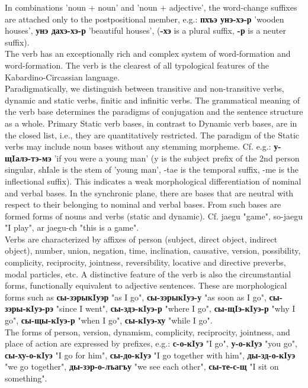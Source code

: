 \documentclass[a4paper,12pt]{book}
\newcommand{\1}[1]{\textbf{\emph{#1}}} %
\newcommand{\2}[1]{\textbf{[#1]}} %
\newcommand{\3}[1]{\fontsize{11pt}{0cm}\textbf{\emph{#1}}} %
\newcommand{\4}[1]{\fontsize{10pt}{0cm}\emph{#1}}	%
\newcommand{\5}[1]{\textbf{/#1/}} %
\newcommand{\6}[1]{\textbf{[#1]}} %
\newcommand{\7}[1]{\fontsize{12pt}{0cm}\emph{#1}} %
\newcommand{\8}[1]{\fontsize{12pt}{0cm}`#1'} %
\newcommand{\9}[1]{\fontsize{12pt}{0cm}(lit. `#1')} %
\begin{document}
In combinations 'noun + noun' and 'noun + adjective', the word-change suffixes are attached only to the postpositional member, e.g.: \textbf{пхъэ унэ-хэ-р} 'wooden houses', \textbf{унэ дахэ-хэ-р} 'beautiful houses', (\textbf{-хэ} is a plural suffix, \textbf{-р} is a neuter suffix).\\
The verb has an exceptionally rich and complex system of word-formation and word-formation. The verb is the clearest of all typological features of the Kabardino-Circassian language.\\
Paradigmatically, we distinguish between transitive and non-transitive verbs, dynamic and static verbs, finitic and infinitic verbs. The grammatical meaning of the verb base determines the paradigms of conjugation and the sentence structure as a whole. Primary Static verb bases, in contrast to Dynamic verb bases, are in the closed list, i.e., they are quantitatively restricted. The paradigm of the Static verbs may include noun bases without any stemming morpheme. Cf. e.g.: \textbf{у-щIалэ-тэ-мэ} 'if you were a young man' (y is the subject prefix of the 2nd person singular, shIale is the stem of 'young man', -tae is the temporal suffix, -me is the inflectional suffix). This indicates a weak morphological differentiation of nominal and verbal bases. In the synchronic plane, there are bases that are neutral with respect to their belonging to nominal and verbal bases. From such bases are formed forms of nouns and verbs (static and dynamic). Cf. jaegu "game", so-jaegu "I play", ar jaegu-ch "this is a game".\\
Verbs are characterized by affixes of person (subject, direct object, indirect object), number, union, negation, time, inclination, causative, version, possibility, complicity, reciprocity, jointness, reversibility, locative and directive preverbs, modal particles, etc. A distinctive feature of the verb is also the circumstantial forms, functionally equivalent to adjective sentences. These are morphological forms such as \textbf{сы-зэрыкIуэр} "as I go", \textbf{сы-зэрыкIуэ-у} "as soon as I go", \textbf{сы-зэры-кIуэ-рэ} "since I went", \textbf{сы-здэ-кIуэ-р} "where I go", \textbf{сы-щIэ-кIуэ-р} "why I go", \textbf{сы-щы-кIуэ-р} "when I go", \textbf{сы-кIуэ-ху} "while I go".\\
The forms of person, version, dynamism, complicity, reciprocity, jointness, and place of action are expressed by prefixes, e.g.: \textbf{с-о-кIуэ} "I go", \textbf{у-о-кIуэ} "you go", \textbf{сы-ху-о-кIуэ} "I go for him", \textbf{сы-до-кIуэ} "I go together with him", \textbf{ды-зд-о-кIуэ} "we go together", \textbf{ды-зэр-о-лъагъу} "we see each other", \textbf{сы-те-с-щ} "I sit on something".\\
\end{document}
